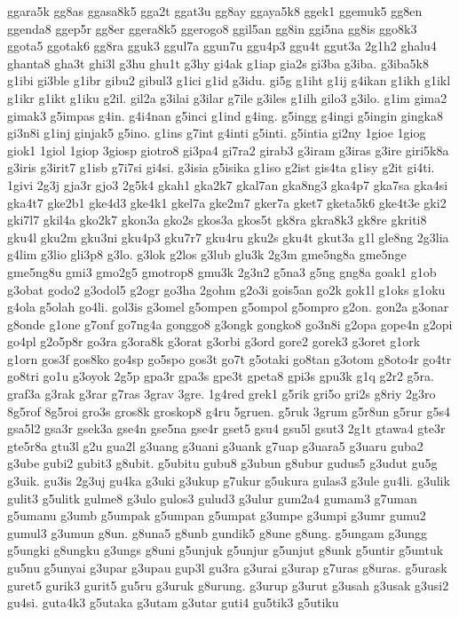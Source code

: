{ggara5k gg8as ggasa8k5 gga2t ggat3u gg8ay ggaya5k8 ggek1 ggemuk5 gg8en
ggenda8 ggep5r gg8er ggera8k5 ggerogo8 ggil5an gg8in ggi5na gg8is ggo8k3
ggota5 ggotak6 gg8ra gguk3 ggul7a ggun7u ggu4p3 ggu4t ggut3a 2g1h2 ghalu4
ghanta8 gha3t ghi3l g3hu ghu1t g3hy gi4ak g1iap gia2s gi3ba g3iba.
g3iba5k8 g1ibi gi3ble g1ibr gibu2 gibul3 g1ici g1id g3idu. gi5g g1iht g1ij
g4ikan g1ikh g1ikl g1ikr g1ikt g1iku g2il. gil2a g3ilai g3ilar g7ile
g3iles g1ilh gilo3 g3ilo. g1im gima2 gimak3 g5impas g4in. g4i4nan g5inci
g1ind g4ing. g5ingg g4ingi g5ingin gingka8 gi3n8i g1inj ginjak5 g5ino.
g1ins g7int g4inti g5inti. g5intia gi2ny 1gioe 1giog giok1 1giol 1giop
3giosp giotro8 gi3pa4 gi7ra2 girab3 g3iram g3iras g3ire giri5k8a g3iris
g3irit7 g1isb g7i7si gi4si. g3isia g5isika g1iso g2ist gis4ta g1isy g2it
gi4ti. 1givi 2g3j gja3r gjo3 2g5k4 gkah1 gka2k7 gkal7an gka8ng3 gka4p7
gka7sa gka4si gka4t7 gke2b1 gke4d3 gke4k1 gkel7a gke2m7 gker7a gket7
gketa5k6 gke4t3e gki2 gki7l7 gkil4a gko2k7 gkon3a gko2s gkos3a gkos5t
gk8ra gkra8k3 gk8re gkriti8 gku4l gku2m gku3ni gku4p3 gku7r7 gku4ru gku2s
gku4t gkut3a g1l gle8ng 2g3lia g4lim g3lio gli3p8 g3lo. g3lok g2los g3lub
glu3k 2g3m gme5ng8a gme5nge gme5ng8u gmi3 gmo2g5 gmotrop8 gmu3k 2g3n2
g5na3 g5ng gng8a goak1 g1ob g3obat godo2 g3odol5 g2ogr go3ha 2gohm g2o3i
gois5an go2k gok1l g1oks g1oku g4ola g5olah go4li. gol3is g3omel g5ompen
g5ompol g5ompro g2on. gon2a g3onar g8onde g1one g7onf go7ng4a gonggo8
g3ongk gongko8 go3n8i g2opa gope4n g2opi go4pl g2o5p8r go3ra g3ora8k
g3orat g3orbi g3ord gore2 gorek3 g3oret g1ork g1orn gos3f gos8ko go4sp
go5spo gos3t go7t g5otaki go8tan g3otom g8oto4r go4tr go8tri go1u g3oyok
2g5p gpa3r gpa3s gpe3t gpeta8 gpi3s gpu3k g1q g2r2 g5ra. graf3a g3rak
g3rar g7ras 3grav 3gre. 1g4red grek1 g5rik gri5o gri2s g8riy 2g3ro 8g5rof
8g5roi gro3s gros8k groskop8 g4ru 5gruen. g5ruk 3grum g5r8un g5rur g5s4
gsa5l2 gsa3r gsek3a gse4n gse5na gse4r gset5 gsu4 gsu5l gsut3 2g1t gtawa4
gte3r gte5r8a gtu3l g2u gua2l g3uang g3uani g3uank g7uap g3uara5 g3uaru
guba2 g3ube gubi2 gubit3 g8ubit. g5ubitu gubu8 g3ubun g8ubur gudus5 g3udut
gu5g g3uik. gu3is 2g3uj gu4ka g3uki g3ukup g7ukur g5ukura gulas3 g3ule
gu4li. g3ulik gulit3 g5ulitk gulme8 g3ulo gulos3 gulud3 g3ulur gum2a4
gumam3 g7uman g5umanu g3umb g5umpak g5umpan g5umpat g3umpe g3umpi g3umr
gumu2 gumul3 g3umun g8un. g8una5 g8unb gundik5 g8une g8ung. g5ungam g3ungg
g5ungki g8ungku g3ungs g8uni g5unjuk g5unjur g5unjut g8unk g5untir g5untuk
gu5nu g5unyai g3upar g3upau gup3l gu3ra g3urai g3urap g7uras g8uras.
g5urask guret5 gurik3 gurit5 gu5ru g3uruk g8urung. g3urup g3urut g3usah
g3usak g3usi2 gu4si. guta4k3 g5utaka g3utam g3utar guti4 gu5tik3 g5utiku
}
